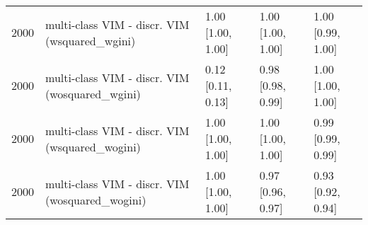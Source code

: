 \begin{table}[ht]
\begin{tabular}{rllll}
  2000 & multi-class VIM - discr. VIM (wsquared\_wgini) & 1.00 [1.00, 1.00] & 1.00 [1.00, 1.00] & 1.00 [0.99, 1.00] \\ 
  2000 & multi-class VIM - discr. VIM (wosquared\_wgini) & 0.12 [0.11, 0.13] & 0.98 [0.98, 0.99] & 1.00 [1.00, 1.00] \\ 
  2000 & multi-class VIM - discr. VIM (wsquared\_wogini) & 1.00 [1.00, 1.00] & 1.00 [1.00, 1.00] & 0.99 [0.99, 0.99] \\ 
  2000 & multi-class VIM - discr. VIM (wosquared\_wogini) & 1.00 [1.00, 1.00] & 0.97 [0.96, 0.97] & 0.93 [0.92, 0.94] \\ 
   \hline
\end{tabular}
\end{table}
